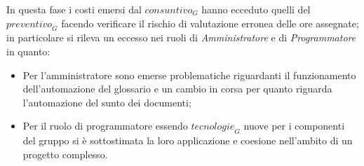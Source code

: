 \newline
In questa fase i costi emersi dal $\textit{consuntivo}_G$ hanno ecceduto quelli del $\textit{preventivo}_G$ facendo verificare il rischio di valutazione erronea delle ore assegnate; in particolare si rileva un eccesso nei ruoli di \emph{Amministratore} e di \emph{Programmatore} in quanto:
\begin{itemize}
    \item Per l'amministratore sono emerse problematiche riguardanti il funzionamento dell'automazione del glossario e un cambio in corsa per quanto riguarda l'automazione del sunto dei documenti;
    \item Per il ruolo di programmatore essendo $\textit{tecnologie}_G$ nuove per i componenti del gruppo si è sottostimata la loro applicazione e coesione nell'ambito di un progetto complesso.
\end{itemize}